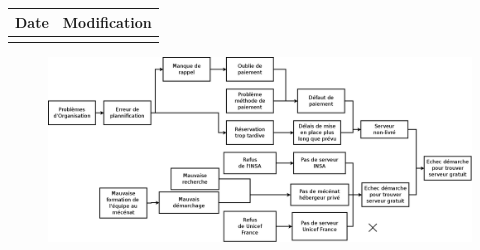 \begin{table}[H]

\centering

	\begin{tabularx}{16.8cm}{|X|X|}

	\hline

	Date & Modification \\

	\hline

	  & \\

	\hline

	\end{tabularx}

\end{table}

\newpage


\begin{figure}
	\centering
	\includegraphics[scale=0.25]{images/AnalyseRisque_nPourquoi_FDO009}
\end{figure}

